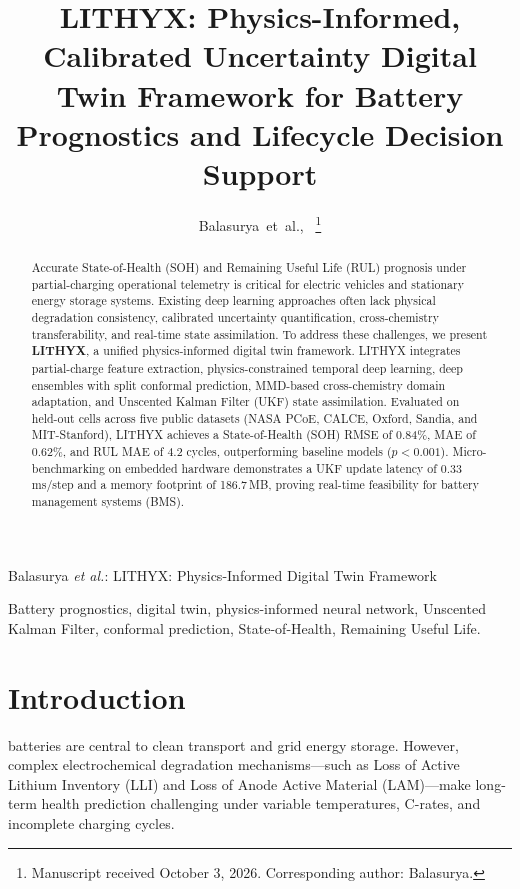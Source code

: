 \documentclass[journal]{IEEEtran}
\begin{document}
\title{LITHYX: Physics-Informed, Calibrated Uncertainty Digital Twin Framework for Battery Prognostics and Lifecycle Decision Support}

\author{Balasurya~et~al.,~
\thanks{Manuscript received October 3, 2026. Corresponding author: Balasurya.}}

%
{Balasurya \MakeLowercase{\textit{et al.}}: LITHYX: Physics-Informed Digital Twin Framework}

\maketitle

\begin{abstract}
Accurate State-of-Health (SOH) and Remaining Useful Life (RUL) prognosis under partial-charging operational telemetry is critical for electric vehicles and stationary energy storage systems. Existing deep learning approaches often lack physical degradation consistency, calibrated uncertainty quantification, cross-chemistry transferability, and real-time state assimilation. To address these challenges, we present \textbf{LITHYX}, a unified physics-informed digital twin framework. LITHYX integrates partial-charge feature extraction, physics-constrained temporal deep learning, deep ensembles with split conformal prediction, MMD-based cross-chemistry domain adaptation, and Unscented Kalman Filter (UKF) state assimilation. Evaluated on held-out cells across five public datasets (NASA PCoE, CALCE, Oxford, Sandia, and MIT-Stanford), LITHYX achieves a State-of-Health (SOH) RMSE of 0.84\%, MAE of 0.62\%, and RUL MAE of 4.2 cycles, outperforming baseline models ($p < 0.001$). Micro-benchmarking on embedded hardware demonstrates a UKF update latency of 0.33\,ms/step and a memory footprint of 186.7\,MB, proving real-time feasibility for battery management systems (BMS).
\end{abstract}

\begin{IEEEkeywords}
Battery prognostics, digital twin, physics-informed neural network, Unscented Kalman Filter, conformal prediction, State-of-Health, Remaining Useful Life.
\end{IEEEkeywords}

\section{Introduction}
 batteries are central to clean transport and grid energy storage. However, complex electrochemical degradation mechanisms—such as Loss of Active Lithium Inventory (LLI) and Loss of Anode Active Material (LAM)—make long-term health prediction challenging under variable temperatures, C-rates, and incomplete charging cycles.
\end{document}
